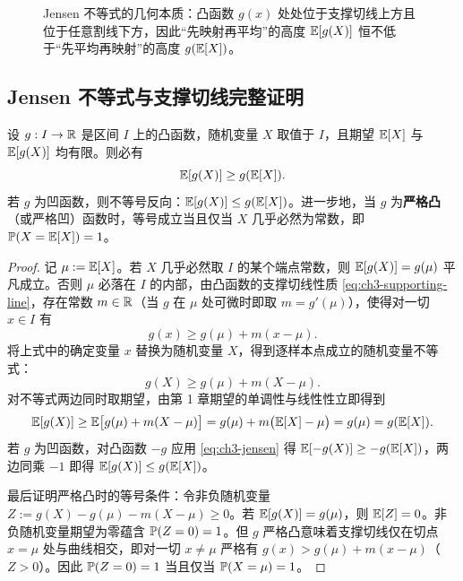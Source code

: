 \begin{figure}[htbp]
  \caption{Jensen 不等式的几何本质：凸函数 $g(x)$ 处处位于支撑切线上方且位于任意割线下方，因此“先映射再平均”的高度 $\mathbb{E}[g(X)]$ 恒不低于“先平均再映射”的高度 $g(\mathbb{E}[X])$。}
  \label{fig:ch3-jensen}
\end{figure}

\subsection{Jensen 不等式与支撑切线完整证明}

\begin{thmBox}
\begin{theorem}
\label{thm:ch3-jensen}
设 $g: I \to \mathbb{R}$ 是区间 $I$ 上的凸函数，随机变量 $X$ 取值于 $I$，且期望 $\mathbb{E}[X]$ 与 $\mathbb{E}[g(X)]$ 均有限。则必有
\begin{equation}
  \mathbb{E}[g(X)] \ge g(\mathbb{E}[X]). \label{eq:ch3-jensen}
\end{equation}
若 $g$ 为凹函数，则不等号反向：$\mathbb{E}[g(X)] \le g(\mathbb{E}[X])$。进一步地，当 $g$ 为\textbf{严格凸}（或严格凹）函数时，等号成立当且仅当 $X$ 几乎必然为常数，即 $\mathbb{P}(X = \mathbb{E}[X]) = 1$。
\end{theorem}
\end{thmBox}

\begin{proof}
记 $\mu := \mathbb{E}[X]$。若 $X$ 几乎必然取 $I$ 的某个端点常数，则 $\mathbb{E}[g(X)] = g(\mu)$ 平凡成立。否则 $\mu$ 必落在 $I$ 的内部，由凸函数的支撑切线性质 \eqref{eq:ch3-supporting-line}，存在常数 $m \in \mathbb{R}$（当 $g$ 在 $\mu$ 处可微时即取 $m = g'(\mu)$），使得对一切 $x \in I$ 有
\[
  g(x) \ge g(\mu) + m(x - \mu).
\]
将上式中的确定变量 $x$ 替换为随机变量 $X$，得到逐样本点成立的随机变量不等式：
\[
  g(X) \ge g(\mu) + m(X - \mu).
\]
对不等式两边同时取期望，由第 1 章期望的单调性与线性性立即得到
\[
  \mathbb{E}[g(X)] \ge \mathbb{E}\bigl[g(\mu) + m(X - \mu)\bigr] = g(\mu) + m\bigl(\mathbb{E}[X] - \mu\bigr) = g(\mu) = g(\mathbb{E}[X]).
\]
若 $g$ 为凹函数，对凸函数 $-g$ 应用 \eqref{eq:ch3-jensen} 得 $\mathbb{E}[-g(X)] \ge -g(\mathbb{E}[X])$，两边同乘 $-1$ 即得 $\mathbb{E}[g(X)] \le g(\mathbb{E}[X])$。

最后证明严格凸时的等号条件：令非负随机变量 $Z := g(X) - g(\mu) - m(X - \mu) \ge 0$。若 $\mathbb{E}[g(X)] = g(\mu)$，则 $\mathbb{E}[Z] = 0$。非负随机变量期望为零蕴含 $\mathbb{P}(Z = 0) = 1$。但 $g$ 严格凸意味着支撑切线仅在切点 $x = \mu$ 处与曲线相交，即对一切 $x \neq \mu$ 严格有 $g(x) > g(\mu) + m(x - \mu)$（$Z > 0$）。因此 $\mathbb{P}(Z = 0) = 1$ 当且仅当 $\mathbb{P}(X = \mu) = 1$。
\end{proof}


